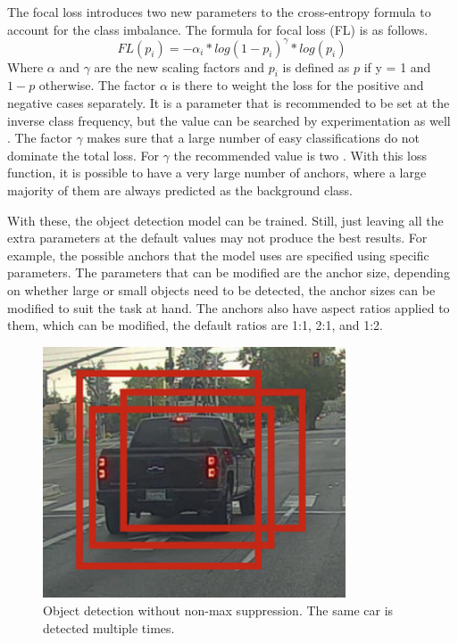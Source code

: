 The focal loss introduces two new parameters to the cross-entropy formula to account for the class imbalance. 
The formula for focal loss (FL) is as follows.
\[FL(p_i) = -\alpha_i * log(1-p_i)^\gamma * log(p_i)\] \noindent
Where $\alpha$ and $\gamma$ are the new scaling factors and $p_i$ is defined as $p$ if y = 1 and $1 - p$ otherwise.
The factor $\alpha$ is there to weight the loss for the positive and negative cases separately. 
It is a parameter that is recommended to be set at the inverse class frequency, but the value can be searched by experimentation as well \citep{retinaNet}.
The factor $\gamma$ makes sure that a large number of easy classifications do not dominate the total loss.
For $\gamma$ the recommended value is two \citep{retinaNet}.
With this loss function, it is possible to have a very large number of anchors, where a large majority of them are always predicted as the background class.

With these, the object detection model can be trained.
Still, just leaving all the extra parameters at the default values may not produce the best results.
For example, the possible anchors that the model uses are specified using specific parameters.
The parameters that can be modified are the anchor size, depending on whether large or small objects need to be detected, the anchor sizes can be modified to suit the task at hand.
The anchors also have aspect ratios applied to them, which can be modified, the default ratios are 1:1, 2:1, and 1:2. 

\begin{figure}[h!]
    \centering
    \includegraphics[width=0.8\textwidth]{imgs/nms.png}
    \caption{Object detection without non-max suppression. The same car is detected multiple times.}
\end{figure}

